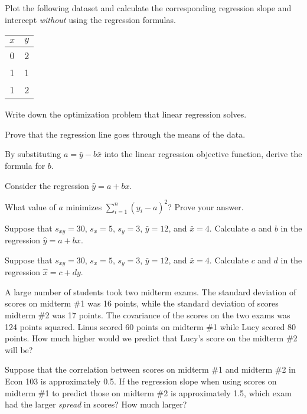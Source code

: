 \documentclass[addpoints,12pt]{exam}
\begin{document}
\begin{questions}
\question Plot the following dataset and calculate the corresponding regression slope and intercept \emph{without} using the regression formulas.\\ 
\begin{tabular}[h]{cc}
  $x$ & $y$\\
  \hline
   0 & 2\\
   1 & 1\\
   1 & 2
\end{tabular}

\question Write down the optimization problem that linear regression solves.

\question Prove that the regression line goes through the means of the data.

\question By substituting $a = \bar{y} - b\bar{x}$ into the linear regression objective function, derive the formula for $b$.

\question Consider the regression $\widehat{y} = a + bx$.

\question What value of $a$ minimizes $\displaystyle\sum_{i=1}^n (y_i - a)^2$? Prove your answer.

\question Suppose that $s_{xy} = 30$, $s_x = 5$, $s_{y} = 3$, $\bar{y} = 12$, and $\bar{x} = 4$. Calculate $a$ and $b$ in the regression $\widehat{y} = a + bx$.

\question Suppose that $s_{xy} = 30$, $s_x = 5$, $s_{y} = 3$, $\bar{y} = 12$, and $\bar{x} = 4$. Calculate $c$ and $d$ in the regression $\widehat{x} = c + dy$.

\question A large number of students took two midterm exams. The standard deviation of scores on midterm \#1 was 16 points, while the standard deviation of scores midterm \#2 was 17 points. The covariance of the scores on the two exams was 124 points squared. Linus scored 60 points on midterm \#1 while Lucy scored 80 points. How much higher would we predict that Lucy's score on the midterm \#2 will be?

\question Suppose that the correlation between scores on midterm \#1 and midterm \#2 in Econ 103 is approximately 0.5. If the regression slope when using scores on midterm \#1 to predict those on midterm \#2 is approximately 1.5, which exam had the larger \emph{spread} in scores? How much larger?


\end{questions}
\end{document}
